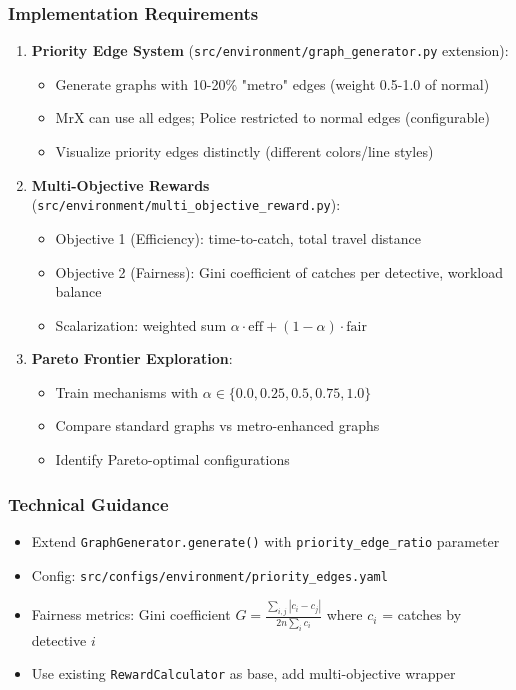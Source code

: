 \documentclass[11pt,a4paper]{scrartcl}
\newcommand{\codepath}[1]{\colorbox{codehighlight}{\texttt{#1}}}
\begin{document}
\subsubsection*{Implementation Requirements}
\begin{enumerate}[leftmargin=1.4em]
    \item \textbf{Priority Edge System} (\codepath{src/environment/graph\_generator.py} extension):
    \begin{itemize}
        \item Generate graphs with 10-20\% "metro" edges (weight 0.5-1.0 of normal)
        \item MrX can use all edges; Police restricted to normal edges (configurable)
        \item Visualize priority edges distinctly (different colors/line styles)
    \end{itemize}
    
    \item \textbf{Multi-Objective Rewards} (\codepath{src/environment/multi\_objective\_reward.py}):
    \begin{itemize}
        \item Objective 1 (Efficiency): time-to-catch, total travel distance
        \item Objective 2 (Fairness): Gini coefficient of catches per detective, workload balance
        \item Scalarization: weighted sum $\alpha \cdot \text{eff} + (1-\alpha) \cdot \text{fair}$
    \end{itemize}
    
    \item \textbf{Pareto Frontier Exploration}:
    \begin{itemize}
        \item Train mechanisms with $\alpha \in \{0.0, 0.25, 0.5, 0.75, 1.0\}$
        \item Compare standard graphs vs metro-enhanced graphs
        \item Identify Pareto-optimal configurations
    \end{itemize}
\end{enumerate}

\subsubsection*{Technical Guidance}
\begin{itemize}[leftmargin=1.2em]
    \item Extend \texttt{GraphGenerator.generate()} with \texttt{priority\_edge\_ratio} parameter
    \item Config: \codepath{src/configs/environment/priority\_edges.yaml}
    \item Fairness metrics: Gini coefficient $G = \frac{\sum_{i,j} |c_i - c_j|}{2n\sum_i c_i}$ where $c_i$ = catches by detective $i$
    \item Use existing \texttt{RewardCalculator} as base, add multi-objective wrapper
\end{itemize}
\end{document}
